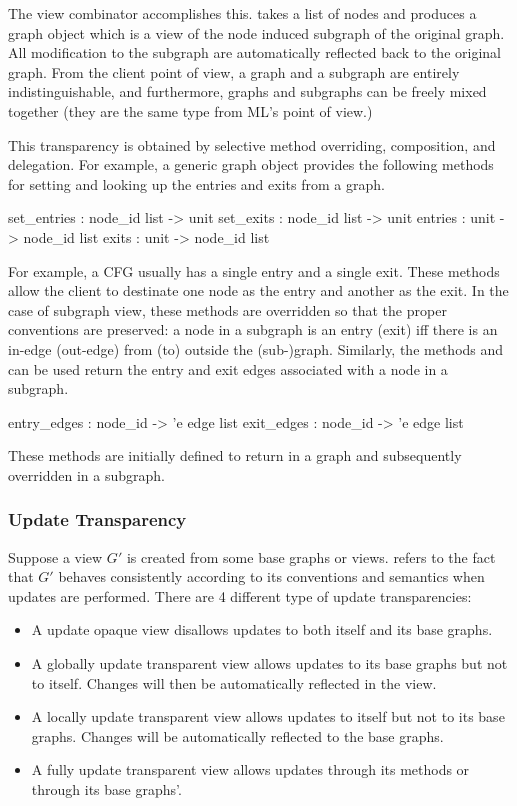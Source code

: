 The  view combinator accomplishes this.  
takes a list of nodes and produces a graph object which is a view of the
node induced subgraph of the original graph.
All modification to the subgraph are automatically
reflected back to the original graph.  From the client point of view,
a graph and a subgraph are entirely indistinguishable, and furthermore,
graphs and subgraphs can be freely mixed together (they are the same
type from ML's point of view.)

This transparency is obtained by selective method overriding, composition,
and delegation.  For example, a generic graph object provides the
following methods for setting and looking up the entries and exits
from a graph.
\begin{SML}
   set_entries  : node_id list -> unit
   set_exits    : node_id list -> unit
   entries      : unit -> node_id list
   exits        : unit -> node_id list
\end{SML}

For example, a CFG usually has a single entry and a single exit.
These methods allow the client to destinate one node as the
entry and another as
the exit.  In the case of subgraph view, these methods are overridden so
that the proper conventions are preserved:
a node in a subgraph is an entry (exit) iff there is an in-edge (out-edge)
from (to) outside the (sub-)graph.
Similarly, the methods  and  can be used
return the entry and exit edges associated with a node in a subgraph.
\begin{SML}
   entry_edges  : node_id -> 'e edge list
   exit_edges   : node_id -> 'e edge list
\end{SML}
These methods are initially defined to return \sml{[]} in a graph and
subsequently overridden in a subgraph.

\subsubsection{ Update Transparency }

Suppose a view $G'$ is created from some base graphs or views.
 refers to the fact that 
$G'$ behaves
consistently according to its conventions and semantics when updates
are performed. There are 4 different type of update transparencies:
\begin{itemize}
\item{}  A update opaque view disallows updates to both
itself and its base graphs.
\item{} A globally update transparent
view allows updates to its base graphs but not to itself.  Changes
will then be automatically reflected in the view.
\item{}  A locally update transparent
view allows updates to itself but not to its base graphs.
Changes will be automatically reflected to the base graphs.
\item{}  A fully update transparent
view allows updates through its methods or through its base
graphs'.  
\end{itemize}

